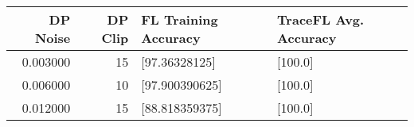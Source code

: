 \begin{tabular}{rrll}
\toprule
DP Noise & DP Clip & FL Training Accuracy & TraceFL Avg. Accuracy \\
\midrule
0.003000 & 15 & [97.36328125] & [100.0] \\
0.006000 & 10 & [97.900390625] & [100.0] \\
0.012000 & 15 & [88.818359375] & [100.0] \\
\bottomrule
\end{tabular}
